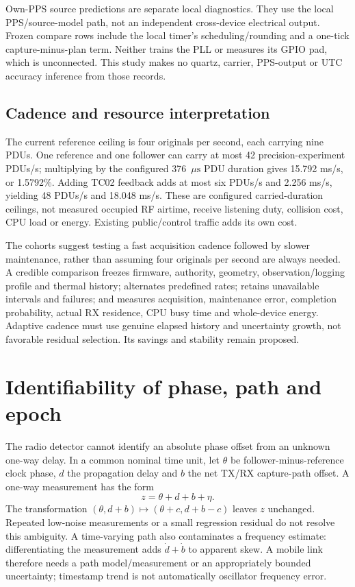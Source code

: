 \documentclass[11pt,letterpaper]{article}
\newcommand{\us}{\,\mu\mathrm{s}}
\begin{document}
Own-PPS source predictions are separate local diagnostics. They use the local PPS/source-model path, not an independent cross-device electrical output. Frozen compare rows include the local timer's scheduling/rounding and a one-tick capture-minus-plan term. Neither trains the PLL or measures its GPIO pad, which is unconnected. This study makes no quartz, carrier, PPS-output or UTC accuracy inference from those records.

\subsection{Cadence and resource interpretation}
The current reference ceiling is four originals per second, each carrying nine PDUs. One reference and one follower can carry at most 42 precision-experiment PDUs/s; multiplying by the configured 376 $\us$ PDU duration gives 15.792 ms/s, or 1.5792\%. Adding TC02 feedback adds at most six PDUs/s and 2.256 ms/s, yielding 48 PDUs/s and 18.048 ms/s. These are configured carried-duration ceilings, not measured occupied RF airtime, receive listening duty, collision cost, CPU load or energy. Existing public/control traffic adds its own cost.

The cohorts suggest testing a fast acquisition cadence followed by slower maintenance, rather than assuming four originals per second are always needed. A credible comparison freezes firmware, authority, geometry, observation/logging profile and thermal history; alternates predefined rates; retains unavailable intervals and failures; and measures acquisition, maintenance error, completion probability, actual RX residence, CPU busy time and whole-device energy. Adaptive cadence must use genuine elapsed history and uncertainty growth, not favorable residual selection. Its savings and stability remain proposed.

\section{Identifiability of phase, path and epoch}
The radio detector cannot identify an absolute phase offset from an unknown one-way delay. In a common nominal time unit, let $\theta$ be follower-minus-reference clock phase, $d$ the propagation delay and $b$ the net TX/RX capture-path offset. A one-way measurement has the form
\begin{equation}
 z=\theta+d+b+\eta .\label{eq:oneway}
\end{equation}
The transformation $(\theta,d+b)\mapsto(\theta+c,d+b-c)$ leaves $z$ unchanged. Repeated low-noise measurements or a small regression residual do not resolve this ambiguity. A time-varying path also contaminates a frequency estimate: differentiating the measurement adds $\dot d+\dot b$ to apparent skew. A mobile link therefore needs a path model/measurement or an appropriately bounded uncertainty; timestamp trend is not automatically oscillator frequency error.
\end{document}
